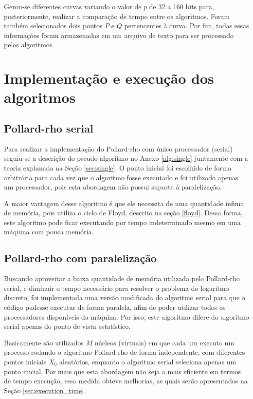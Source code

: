 Gerou-se diferentes curvas variando o valor de \(p\) de 32 a 160 bits para, posteriormente, realizar a comparação de tempo entre os algoritmos. Foram também selecionados dois pontos \(P\) e \(Q\) pertencentes à curva. Por fim, todas essas informações foram armazenadas em um arquivo de texto para ser processado pelos algoritmos.

\section{Implementação e execução dos algoritmos}

\subsection{Pollard-rho serial}
Para realizar a implementação do Pollard-rho com único processador (serial) seguiu-se a descrição do pseudo-algoritmo no Anexo \ref{alg:single} juntamente com a teoria explanada na Seção \ref{sec:single}. O ponto inicial foi escolhido de forma arbitrária para cada vez que o algoritmo fosse executado e foi utilizado apenas um processador, pois esta abordagem não possui suporte à paralelização.

A maior vantagem desse algoritmo é que ele necessita de uma quantidade ínfima de memória, pois utiliza o ciclo de Floyd, descrito na seção \ref{floyd}. Dessa forma, este algoritmo pode ficar executando por tempo indeterminado mesmo em uma máquina com pouca memória.

\subsection{Pollard-rho com paralelização}
Buscando aproveitar a baixa quantidade de memória utilizada pelo Pollard-rho serial, e diminuir o tempo necessário para resolver o problema do logaritmo discreto, foi implementada uma versão modificada do algoritmo serial para que o código pudesse executar de forma paralela, afim de poder utilizar todos os processadores disponíveis da máquina. Por isso, este algoritmo difere do algoritmo serial apenas do ponto de vista estatístico.

Basicamente são utilizados \(M\) núcleos (virtuais) em que cada um executa um processo rodando o algoritmo Pollard-rho de forma independente, com diferentes pontos iniciais \(X_0\) aleatórios, enquanto o algoritmo serial seleciona apenas um ponto inicial. Por mais que esta abordagem não seja a mais eficiente em termos de tempo execução, essa medida obteve melhorias, as quais serão apresentados na Seção \ref{sec:execution_time}.

